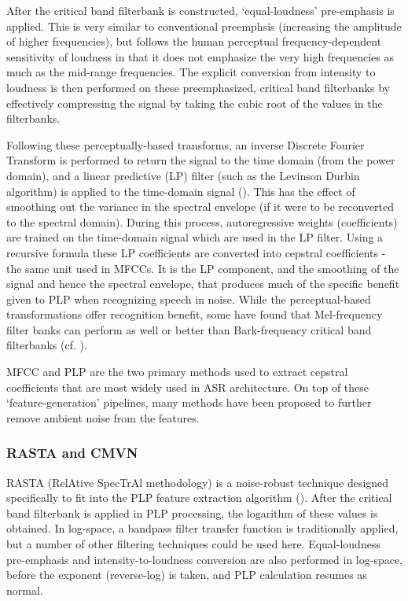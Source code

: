 After the critical band filterbank is constructed, `equal-loudness' pre-emphasis is applied.  This is very similar to conventional preemphsis (increasing the amplitude of higher frequencies), but follows the human perceptual frequency-dependent sensitivity of loudness in that it does not emphasize the very high frequencies as much as the mid-range frequencies.%
The explicit conversion from intensity to loudness is then performed on these preemphasized, critical band filterbanks by effectively compressing the signal by taking the cubic root of the values in the filterbanks.

Following these perceptually-based transforms, an inverse Discrete Fourier Transform is performed to return the signal to the time domain (from the power domain), and a linear predictive (LP) filter (such as the Levinson Durbin algorithm) is applied to the time-domain signal (\cite{gold:11}).  This has the effect of smoothing out the variance in the spectral envelope (if it were to be reconverted to the spectral domain).  During this process, autoregressive weights (coefficients) are trained on the time-domain signal which are used in the LP filter.  Using a recursive formula these LP coefficients are converted into cepstral coefficients - the same unit used in MFCCs.  It is the LP component, and the smoothing of the signal and hence the spectral envelope, that produces much of the specific benefit given to PLP when recognizing speech in noise.  While the perceptual-based transformations offer recognition benefit, some have found that Mel-frequency filter banks can perform as well or better than Bark-frequency critical band filterbanks (cf. \cite{honig:05}).

MFCC and PLP are the two primary methods used to extract cepstral coefficients that are most widely used in ASR architecture.  On top of these `feature-generation' pipelines, many methods have been proposed to further remove ambient noise from the features.

\subsubsection{RASTA and CMVN}\label{sec:rasta_cmvn}

RASTA (RelAtive SpecTrAl methodology) is a noise-robust technique designed specifically to fit into the PLP feature extraction algorithm (\cite{hermansky:92}).  After the critical band filterbank is applied in PLP processing, the logarithm of these values is obtained.  In log-space, a bandpass filter transfer function is traditionally applied, but a number of other filtering techniques could be used here.  Equal-loudness pre-emphasis and intensity-to-loudness conversion are also performed in log-space, before the exponent (reverse-log) is taken, and PLP calculation resumes as normal.

